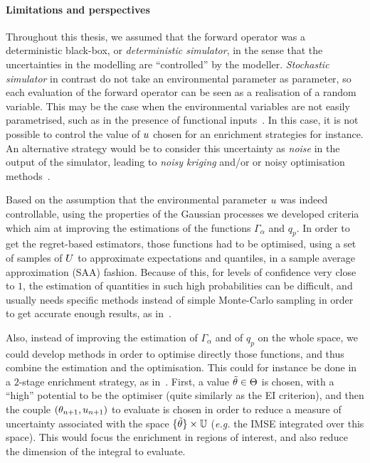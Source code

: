 \documentclass[../../Main_ManuscritThese.tex]{subfiles}
\begin{document}
\paragraph{Limitations and perspectives}
Throughout this thesis, we assumed that the forward operator was a
deterministic black-box, or \emph{deterministic simulator}, in the
sense that the uncertainties in the modelling are ``controlled'' by
the modeller. \emph{Stochastic simulator} in contrast do not take an
environmental parameter as parameter, so each evaluation of the
forward operator can be seen as a realisation of a random
variable. This may be the case when the environmental variables are
not easily parametrised, such as in the presence of functional
inputs~\citep{el_amri_analyse_2019}. In this case, it is not possible
to control the value of $u$ chosen for an enrichment strategies for
instance. An alternative strategy would be to consider this
uncertainty as \emph{noise} in the output of the simulator, leading to
\emph{noisy kriging} and/or or noisy optimisation
methods~\citep{picheny_noisy_2014}.

Based on the assumption that the environmental parameter $u$ was
indeed controllable, using the properties of the Gaussian processes we
developed criteria which aim at improving the estimations of the
functions $\Gamma_\alpha$ and $q_p$. In order to get the regret-based
estimators, those functions had to be optimised, using a set of
samples of $U$ to approximate expectations and quantiles, in a
sample average approximation (SAA) fashion. Because of this, for
levels of confidence very close to $1$, the estimation of quantities
in such high probabilities can be difficult, and usually needs
specific methods instead of simple Monte-Carlo sampling in order to
get accurate enough results, as in~\cite{razaaly_rare_2019}.

Also, instead of improving the estimation of $\Gamma_{\alpha}$ and of
$q_p$ on the whole space, we could develop methods in order to
optimise directly those functions, and thus combine the estimation and
the optimisation.  This could for instance be done in a $2$-stage
enrichment strategy, as
in~\cite{janusevskis_simultaneous_2010}. First, a value
$\tilde{\theta} \in \Theta$ is chosen, with a ``high'' potential to be
the optimiser (quite similarly as the EI criterion), and then the
couple $(\theta_{n+1}, u_{n+1})$ to evaluate is chosen in order to
reduce a measure of uncertainty associated with the space
$\{\tilde{\theta}\} \times \mathbb{U}$ (\emph{e.g.} the IMSE integrated over
this space). This would focus the enrichment in regions of interest,
and also reduce the dimension of the integral to evaluate.
\end{document}
